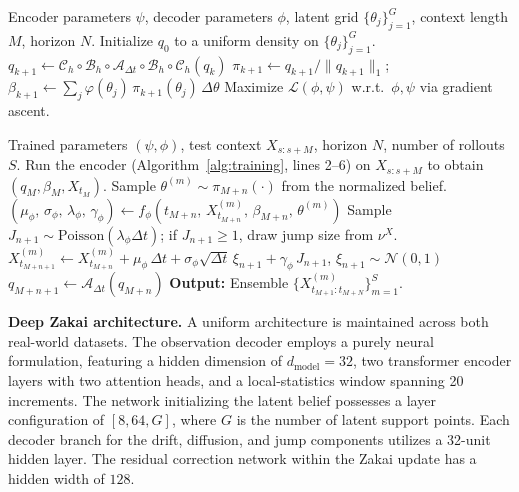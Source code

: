 \documentclass{article}
\begin{document}
\begin{algorithm}[t]
\caption{Training of \textit{Deep ZakaiJ}.}
\label{alg:training}
\small
\begin{algorithmic}[1]
\Require Encoder parameters $\psi$, decoder parameters $\phi$, latent grid $\{\theta_j\}_{j=1}^G$, context length $M$, horizon $N$.
    \State Initialize $q_0$ to a uniform density on $\{\theta_j\}_{j=1}^G$.
        \State $q_{k+1} \gets \mathcal{C}_h \circ \mathcal{B}_h \circ \mathcal{A}_{\Delta t} \circ \mathcal{B}_h \circ \mathcal{C}_h(q_k)$ 
        \State $\pi_{k+1} \gets q_{k+1} / \|q_{k+1}\|_1$;\quad $\beta_{k+1} \gets \sum_j \varphi(\theta_j)\,\pi_{k+1}(\theta_j)\,\Delta\theta$
    \EndFor
    \State Maximize $\mathcal{L}(\phi,\psi)$ w.r.t.\ $\phi,\psi$ via gradient ascent.
\EndFor
\end{algorithmic}
\end{algorithm}

\begin{algorithm}[t]
\caption{Inference of \textit{Deep ZakaiJ}.}
\label{alg:inference}
\small
\begin{algorithmic}[1]
\Require Trained parameters $(\psi,\phi)$, test context $X_{s:s+M}$, horizon $N$, number of rollouts $S$.
\State Run the encoder (Algorithm~\ref{alg:training}, lines 2--6) on $X_{s:s+M}$ to obtain $(q_M, \beta_M, X_{t_M})$.
        \State Sample $\theta^{(m)} \sim \pi_{M+n}(\cdot)$ from the normalized belief.
        \State $(\mu_\phi,\,\sigma_\phi,\,\lambda_\phi,\,\gamma_\phi) \gets f_\phi(t_{M+n},\, X_{t_{M+n}}^{(m)},\, \beta_{M+n},\, \theta^{(m)})$
        \State Sample $J_{n+1} \sim \mathrm{Poisson}(\lambda_\phi \Delta t)$; if $J_{n+1} \ge 1$, draw jump size from $\nu^X$.
        \State $X_{t_{M+n+1}}^{(m)} \gets X_{t_{M+n}}^{(m)} + \mu_\phi\,\Delta t + \sigma_\phi\sqrt{\Delta t}\,\xi_{n+1} + \gamma_\phi\, J_{n+1}$, \quad $\xi_{n+1}\sim\mathcal{N}(0,1)$
        \State $q_{M+n+1} \gets \mathcal{A}_{\Delta t}(q_{M+n})$ 
    \EndFor
\EndFor
\State \textbf{Output:} Ensemble $\{X_{t_{M+1}:t_{M+N}}^{(m)}\}_{m=1}^S$.
\end{algorithmic}
\end{algorithm}

\textbf{Deep Zakai architecture.}
A uniform architecture is maintained across both real-world datasets. The observation decoder employs a purely neural formulation, featuring a hidden dimension of $d_{\mathrm{model}}=32$, two transformer encoder layers with two attention heads, and a local-statistics window spanning 20 increments. The network initializing the latent belief possesses a layer configuration of $[8, 64, G]$, where $G$ is the number of latent support points. Each decoder branch for the drift, diffusion, and jump components utilizes a 32-unit hidden layer. The residual correction network within the Zakai update has a hidden width of $128$. 
\end{document}
